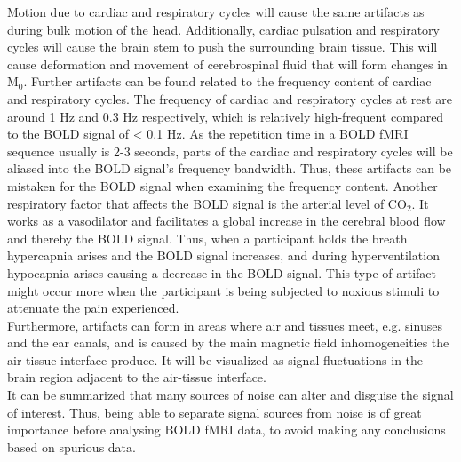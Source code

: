 Motion due to cardiac and respiratory cycles will cause the same artifacts as during bulk motion of the head. Additionally, cardiac pulsation and respiratory cycles will cause the brain stem to push the surrounding brain tissue. This will cause deformation and movement of cerebrospinal fluid that will form changes in M$_0$. Further artifacts can be found related to the frequency content of cardiac and respiratory cycles. The frequency of cardiac and respiratory cycles at rest are around 1 Hz and 0.3 Hz respectively, which is relatively high-frequent compared to the BOLD signal of < 0.1 Hz. As the repetition time in a BOLD fMRI sequence usually is 2-3 seconds, parts of the cardiac and respiratory cycles will be aliased into the BOLD signal’s frequency bandwidth. Thus, these artifacts can be mistaken for the BOLD signal when examining the frequency content. Another respiratory factor that affects the BOLD signal is the arterial level of CO$_2$. It works as a vasodilator and facilitates a global increase in the cerebral blood flow and thereby the BOLD signal. Thus, when a participant holds the breath hypercapnia arises and the BOLD signal increases, and during hyperventilation hypocapnia arises causing a decrease in the BOLD signal.  \cite{Murphy2013} This type of artifact might occur more when the participant is being subjected to noxious stimuli to attenuate the pain experienced. \cite{Poldrack2011}  \\
Furthermore, artifacts can form in areas where air and tissues meet, e.g. sinuses and the ear canals, and is caused by the main magnetic field inhomogeneities the air-tissue interface produce. It will be visualized as signal fluctuations in the brain region adjacent to the air-tissue interface. \cite{Poldrack2011} \\
It can be summarized that many sources of noise can alter and disguise the signal of interest. Thus, being able to separate signal sources from noise is of great importance before analysing BOLD fMRI data, to avoid making any conclusions based on spurious data.



